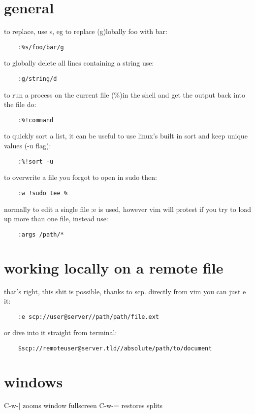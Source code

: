 \section{general}%
\label{sec:general}

to replace, use s, eg to replace (g)lobally foo with bar:
\begin{verbatim}
	:%s/foo/bar/g
\end{verbatim}

to globally delete all lines containing a string use:
\begin{verbatim}
	:g/string/d
\end{verbatim}

to run a process on the current file (\%)in the shell and get the output back into the file do:
\begin{verbatim}
	:%!command
\end{verbatim}

to quickly sort a list, it can be useful to use linux's built in sort and keep unique values (-u flag):
\begin{verbatim}
	:%!sort -u
\end{verbatim}

to overwrite a file you forgot to open in sudo then:
\begin{verbatim}
	:w !sudo tee %
\end{verbatim}

normally to edit a single file :e is used, however vim will protest if you try to load up more than one file, instead use:
\begin{verbatim}
	:args /path/*
\end{verbatim}
\section{working locally on a remote file}%
\label{sec:working_locally_on_a_remote_file}

that's right, this shit is possible, thanks to scp. directly from vim you can just e it:
\begin{verbatim}
	:e scp://user@server//path/path/file.ext	
\end{verbatim}
or dive into it straight from terminal:
\begin{verbatim}
	$scp://remoteuser@server.tld//absolute/path/to/document
\end{verbatim}

\section*{windows}%
\label{sec:windows}

C-w-| zooms window fullscreen
C-w-= restores splits
